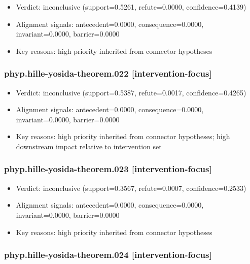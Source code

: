 \documentclass[
]{article}
\providecommand{\tightlist}{%
  \setlength{\itemsep}{0pt}\setlength{\parskip}{0pt}}
\begin{document}
\begin{itemize}
\tightlist
\item
  Verdict: inconclusive (support=0.5261, refute=0.0000,
  confidence=0.4139)
\item
  Alignment signals: antecedent=0.0000, consequence=0.0000,
  invariant=0.0000, barrier=0.0000
\item
  Key reasons: high priority inherited from connector hypotheses
\end{itemize}

\subsubsection{phyp.hille-yosida-theorem.022
{[}intervention-focus{]}}\label{phyphille-yosida-theorem022-intervention-focus}

\begin{itemize}
\tightlist
\item
  Verdict: inconclusive (support=0.5387, refute=0.0017,
  confidence=0.4265)
\item
  Alignment signals: antecedent=0.0000, consequence=0.0000,
  invariant=0.0000, barrier=0.0000
\item
  Key reasons: high priority inherited from connector hypotheses; high
  downstream impact relative to intervention set
\end{itemize}

\subsubsection{phyp.hille-yosida-theorem.023
{[}intervention-focus{]}}\label{phyphille-yosida-theorem023-intervention-focus}

\begin{itemize}
\tightlist
\item
  Verdict: inconclusive (support=0.3567, refute=0.0007,
  confidence=0.2533)
\item
  Alignment signals: antecedent=0.0000, consequence=0.0000,
  invariant=0.0000, barrier=0.0000
\item
  Key reasons: high priority inherited from connector hypotheses
\end{itemize}

\subsubsection{phyp.hille-yosida-theorem.024
{[}intervention-focus{]}}\label{phyphille-yosida-theorem024-intervention-focus}
\end{document}
